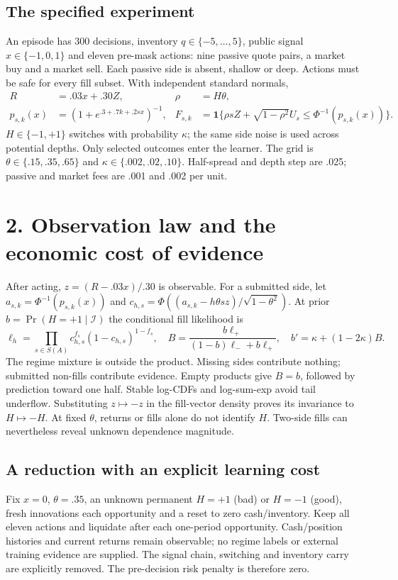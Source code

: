 \documentclass[11pt,a4paper]{article}
\begin{document}
\subsection*{The specified experiment}
An episode has 300 decisions, inventory $q\in\{-5,\ldots,5\}$, public signal
$x\in\{-1,0,1\}$ and eleven pre-mask actions: nine passive quote pairs, a market
buy and a market sell. Each passive side is absent, shallow or deep. Actions must
be safe for every fill subset. With independent standard normals,
\begin{align*}
R&=.03x+.30Z,& \rho&=H\theta,\\
p_{s,k}(x)&=(1+e^{.3+.7k+.2sx})^{-1},&
F_{s,k}&=\mathbf1\{\rho sZ+\sqrt{1-\rho^2}U_s\le\Phi^{-1}(p_{s,k}(x))\}.
\end{align*}
$H\in\{-1,+1\}$ switches with probability $\kappa$; the same side noise is used
across potential depths. Only selected outcomes enter the learner. The grid is
$\theta\in\{.15,.35,.65\}$ and $\kappa\in\{.002,.02,.10\}$. Half-spread and
depth step are .025; passive and market fees are .001 and .002 per unit.

\newpage
\section*{2. Observation law and the economic cost of evidence}
After acting, $z=(R-.03x)/.30$ is observable. For a submitted side, let
$a_{s,k}=\Phi^{-1}(p_{s,k}(x))$ and
$c_{h,s}=\Phi((a_{s,k}-h\theta sz)/\sqrt{1-\theta^2})$. At prior
$b=\Pr(H=+1\mid\mathcal I)$ the conditional fill likelihood is
\[
\ell_h=\prod_{s\in S(A)}c_{h,s}^{f_s}(1-c_{h,s})^{1-f_s},\quad
B=\frac{b\ell_+}{(1-b)\ell_-+b\ell_+},\quad
b'=\kappa+(1-2\kappa)B.
\]
The regime mixture is outside the product. Missing sides contribute nothing;
submitted non-fills contribute evidence. Empty products give $B=b$, followed by
prediction toward one half. Stable log-CDFs and log-sum-exp avoid tail underflow.
Substituting $z\mapsto-z$ in the fill-vector density proves its invariance to
$H\mapsto-H$. At fixed $\theta$, returns or fills alone do not identify $H$.
Two-side fills can nevertheless reveal unknown dependence magnitude.

\subsection*{A reduction with an explicit learning cost}
Fix $x=0$, $\theta=.35$, an unknown permanent $H=+1$ (bad) or $H=-1$ (good),
fresh innovations each opportunity and a reset to zero cash/inventory. Keep all
eleven actions and liquidate after each one-period opportunity. Cash/position
histories and current returns remain observable; no regime labels or external
training evidence are supplied. The signal chain, switching and inventory
carry are explicitly removed. The pre-decision risk penalty is therefore zero.
\end{document}
